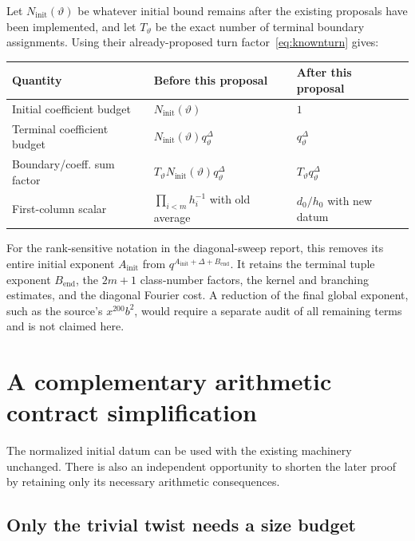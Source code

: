 Let $N_{\mathrm{init}}(\vartheta)$ be whatever initial bound remains after the existing proposals have been implemented, and let $T_\vartheta$ be the exact number of terminal boundary assignments. Using their already-proposed turn factor~\eqref{eq:knownturn} gives:
\begin{center}
\begin{tabular}{@{}lll@{}}
\toprule
Quantity & Before this proposal & After this proposal\\
\midrule
Initial coefficient budget & $N_{\mathrm{init}}(\vartheta)$ & $1$\\
Terminal coefficient budget & $N_{\mathrm{init}}(\vartheta)q_\vartheta^\Delta$ & $q_\vartheta^\Delta$\\
Boundary/coeff. sum factor & $T_\vartheta N_{\mathrm{init}}(\vartheta)q_\vartheta^\Delta$ & $T_\vartheta q_\vartheta^\Delta$\\
First-column scalar & $\prod_{i<m}h_i^{-1}$ with old average & $d_0/h_0$ with new datum\\
\bottomrule
\end{tabular}
\end{center}
For the rank-sensitive notation in the diagonal-sweep report, this removes its entire initial exponent $A_{\mathrm{init}}$ from $q^{A_{\mathrm{init}}+\Delta+B_{\mathrm{end}}}$. It retains the terminal tuple exponent $B_{\mathrm{end}}$, the $2m+1$ class-number factors, the kernel and branching estimates, and the diagonal Fourier cost. A reduction of the final global exponent, such as the source's $x^{200}b^2$, would require a separate audit of all remaining terms and is not claimed here.

\section{A complementary arithmetic contract simplification}
\label{sec:arithmetic}

The normalized initial datum can be used with the existing  machinery unchanged. There is also an independent opportunity to shorten the later proof by retaining only its necessary arithmetic consequences.

\subsection{Only the trivial twist needs a size budget}

